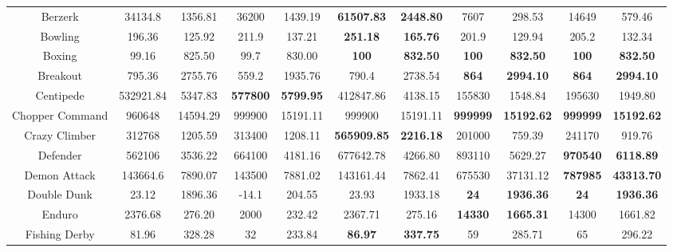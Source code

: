 \documentclass[nohyperref]{article}
\newcommand{\best}[1]{\textbf{#1}}
\theoremstyle{plain}
\begin{document}
\begin{table}[!hb]
\begin{center}
\begin{tabular}{| c| c c| c c| c c| c c| c c|}
 Berzerk & 34134.8      & 1356.81 & 36200 & 1439.19  & \textbf{61507.83} & \textbf{2448.80}         &7607              &298.53                &14649             &579.46       \\
 Bowling & 196.36       & 125.92  & 211.9 & 137.21   & \textbf{251.18}   & \textbf{165.76}          &201.9             &129.94                &205.2             &132.34       \\
 Boxing  & 99.16        & 825.50  & 99.7  & 830.00   & \textbf{100}      & \textbf{832.50}          &\best{100}        &\best{832.50}         &\textbf{100}               &\textbf{832.50}       \\
 Breakout & 795.36      & 2755.76 & 559.2 & 1935.76  & 790.4 & 2738.54                  &\best{864}        &\best{2994.10}                    &\textbf{864}             &\textbf{2994.10}      \\
 Centipede & 532921.84  & 5347.83 & \textbf{577800} & \textbf{5799.95} & 412847.86& 4138.15         &155830            &1548.84               &195630            &1949.80\\
 Chopper Command&960648&14594.29&999900&15191.11&999900&15191.11                                    &\best{999999}&\best{15192.62}            &\textbf{999999}            &\textbf{15192.62}\\
 Crazy Climber & 312768   & 1205.59  & 313400 & 1208.11&\textbf{565909.85}&\textbf{2216.18}         &201000            &759.39                &241170            &919.76\\
 Defender & 562106        & 3536.22  & 664100 & 4181.16  & 677642.78 & 4266.80                      &893110     &5629.27                      &\textbf{970540}            &\textbf{6118.89}\\
 Demon Attack & 143664.6  & 7890.07  & 143500 & 7881.02  & 143161.44 & 7862.41                      &675530     &37131.12       &\textbf{787985}                     &\textbf{43313.70}\\
 Double Dunk & 23.12      & 1896.36  & -14.1  & 204.55   & 23.93& 1933.18         &\textbf{24}      &\textbf{1936.36}                         &\textbf{24}                &\textbf{1936.36}\\
 Enduro      & 2376.68    & 276.20   & 2000   & 232.42   & 2367.71   & 275.16                       &\best{14330}      &\best{1665.31}        &14300             &1661.82\\
 Fishing Derby & 81.96    & 328.28   & 32     & 233.84   & \textbf{86.97}& \textbf{337.75}          &59                &285.71                &65               &296.22\\

\end{tabular}
\end{center}
\end{table}
\end{document}
